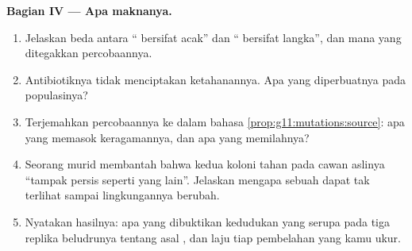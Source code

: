 \begin{problem}
\medskip
\noindent\textbf{Bagian IV --- Apa maknanya.}
\begin{enumerate}[resume]
  \item Jelaskan beda antara `` bersifat acak'' dan ``
        bersifat langka'', dan mana yang ditegakkan percobaannya.
  \item Antibiotiknya tidak menciptakan ketahanannya. Apa yang
        diperbuatnya pada populasinya?
  \item Terjemahkan percobaannya ke dalam bahasa
        \cref{prop:g11:mutations:source}: apa yang memasok keragamannya,
        dan apa yang memilahnya?
  \item Seorang murid membantah bahwa kedua koloni tahan pada cawan
        aslinya ``tampak persis seperti yang lain''. Jelaskan mengapa
        sebuah  dapat tak terlihat sampai lingkungannya berubah.
  \item Nyatakan hasilnya: apa yang dibuktikan kedudukan yang serupa
        pada tiga replika beludrunya tentang asal , dan laju
        tiap pembelahan yang kamu ukur.
\end{enumerate}
\end{problem}
